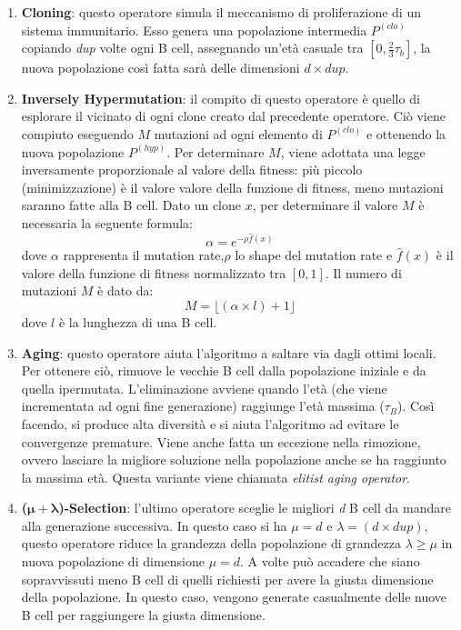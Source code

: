 \documentclass[a4paper,12pt,titlepage,oneside]{article}
\begin{document}
\begin{enumerate}
\item \textbf{Cloning}: questo operatore simula il meccanismo di proliferazione di un sistema immunitario. Esso genera una popolazione intermedia $P^{(clo)}$ copiando \textit{dup} volte ogni B cell, assegnando un'età casuale tra $[0, \frac{2}{3} \tau_{b}]$, la nuova popolazione così fatta sarà delle dimensioni \textit{$d \times dup$}. 
\item \textbf{Inversely Hypermutation}: il compito di questo operatore è quello di esplorare il vicinato di ogni clone creato dal precedente operatore. Ciò viene compiuto eseguendo $M$ mutazioni ad ogni elemento di $P^{(clo)}$ e ottenendo la nuova popolazione $P^{(hyp)}$. Per determinare $M$, viene adottata una legge inversamente proporzionale al valore della fitness: più piccolo (minimizzazione) è il valore valore della funzione di fitness, meno mutazioni saranno fatte alla B cell. Dato un clone $x$, per determinare il valore $M$ è necessaria la seguente formula:
\begin{equation}
\alpha=e^{-\rho\hat{f}(x)}
\end{equation}
dove $\alpha$ rappresenta il mutation rate,$\rho$ lo shape del mutation rate e $\hat{f}(x)$ è il valore della funzione di fitness normalizzato tra $[0,1]$. Il numero di mutazioni $M$ è dato da:
\begin{equation}
M = \lfloor(\alpha \times l) + 1 \rfloor
\end{equation}
dove $l$ è la lunghezza di una B cell. 
\item \textbf{Aging}: questo operatore aiuta l'algoritmo a saltare via dagli ottimi locali. Per ottenere ciò, rimuove le vecchie B cell dalla popolazione iniziale e da quella ipermutata. L'eliminazione avviene quando l'età (che viene incrementata ad ogni fine generazione) raggiunge l'età massima ($\tau_{B}$). Così facendo, si produce alta diversità e si aiuta l'algoritmo ad evitare le convergenze premature. Viene anche fatta un eccezione nella rimozione, ovvero lasciare la migliore soluzione nella popolazione anche se ha raggiunto la massima età. Questa variante viene chiamata \textit{elitist aging operator}.
\item \textbf{($\mathbf{\mu + \lambda}$)-Selection}: l'ultimo operatore sceglie le migliori \textit{d} B cell da mandare alla generazione successiva. In questo caso si ha $\mu = d$ e $\lambda = (d \times dup)$, questo operatore riduce la grandezza della popolazione di grandezza $\lambda \geq  \mu$ in nuova popolazione di dimensione $\mu=d$. A volte può accadere che siano sopravvissuti meno B cell di quelli richiesti per avere la giusta dimensione della popolazione. In questo caso, vengono generate casualmente delle nuove B cell per raggiungere la giusta dimensione.

\end{enumerate}
\end{document}

